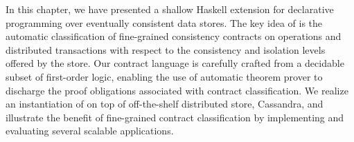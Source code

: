 In this chapter, we have presented \quelea a shallow Haskell extension for
declarative programming over eventually consistent data stores. The key idea of
\quelea is the automatic classification of fine-grained consistency contracts on
operations and distributed transactions with respect to the consistency and
isolation levels offered by the store. Our contract language is carefully
crafted from a decidable subset of first-order logic, enabling the use of
automatic theorem prover to discharge the proof obligations associated with
contract classification. We realize an instantiation of \quelea on top of
off-the-shelf distributed store, Cassandra, and illustrate the benefit of
fine-grained contract classification by implementing and evaluating several
scalable applications.
